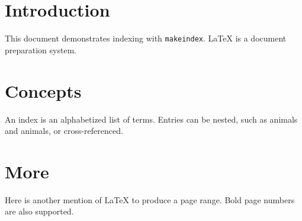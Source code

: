 \documentclass{article}
\begin{document}
\section{Introduction}
This document demonstrates indexing with \texttt{makeindex}.
LaTeX is a document preparation system.

\section{Concepts}
An index is an alphabetized list of terms.
Entries can be nested, such as animals and
animals, or cross-referenced.

\section{More}
Here is another mention of LaTeX to produce a page range.
Bold page numbers are also supported.

\printindex
\end{document}
